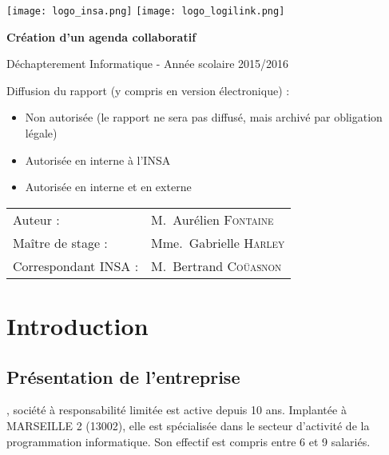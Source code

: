\documentclass[a4paper, 11pt]{report}
\begin{document}
    \begin{titlepage}
        \texttt{[image: logo\_insa.png]}
        \hspace{0.35\textwidth}
        \texttt{[image: logo\_logilink.png]}
        \begin{center}
            \vspace{7cm}
            {\huge\bfseries Création d'un agenda collaboratif \par}
            \vspace{0.5cm}
            {\Large Déchapterement Informatique - Année scolaire 2015/2016\par}
        \end{center}
        \vfill

        Diffusion du rapport (y compris en version électronique) :

        \begin{itemize}[label=$\square$]
            \item Non autorisée (le rapport ne sera pas diffusé, mais archivé par obligation légale)
            \item Autorisée en interne à l’INSA
            \item Autorisée en interne et en externe
        \end{itemize}

        \vspace{0.5cm}

        \begin{tabular}{ll}
            {\Large Auteur :}             & M.~Aurélien \textsc{Fontaine}\\
            {\Large Maître de stage :}    & Mme.~Gabrielle \textsc{Harley}\\
            {\Large Correspondant INSA :} & M.~Bertrand \textsc{Coüasnon}\\
        \end{tabular}
    \end{titlepage}

\tableofcontents

\chapter{Introduction}
\section{Présentation de l'entreprise}
\logilink, société à responsabilité limitée est active depuis 10 ans.
Implantée à MARSEILLE 2 (13002), elle est spécialisée dans le secteur d'activité de la programmation informatique. Son effectif est compris entre 6 et 9 salariés.
\end{document}
